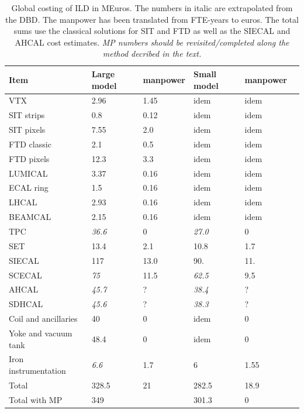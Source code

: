 \begin{table}[h!]\hspace*{-0cm}\small
\begin{tabular}{ l p{0.2\hsize}p{0.1\hsize}p{0.2\hsize} p{0.2\hsize}p{0.1\hsize}}
\toprule
\bf {Item}& \bf {Large model} & \bf manpower&  \bf {Small model}&\bf manpower \\
\midrule
VTX        & 2.96  &1.45  &  idem &idem \\
SIT strips & 0.8   &0.12 & idem&idem\\
SIT pixels & 7.55  &2.0 & idem&idem\\
FTD classic & 2.1   &0.5  & idem &idem  \\
FTD pixels  & 12.3  &3.3  & idem &idem  \\
LUMICAL & 3.37  & 0.16& idem&idem\\
ECAL ring & 1.5 & 0.16 & idem&idem\\
LHCAL   & 2.93  & 0.16&idem& idem\\
BEAMCAL & 2.15  & 0.16& idem&idem\\
\midrule
TPC & \it36.6 & 0 & \it27.0 & 0\\
SET    & 13.4& 2.1&10.8&1.7\\
SIECAL & 117 & 13.0 & 90. & 11.\\
SCECAL & \it75 & 11.5 & \it62.5 & 9.5\\
AHCAL  & \it45.7 & ? & \it38.4 & ?\\
SDHCAL & \it45.6 & ? & \it38.3 & ?\\
Coil and ancillaries &  40 & 0& idem & 0\\
Yoke and vacuum tank &  48.4 & 0& idem & 0 \\
Iron instrumentation  &  \it6.6 & 1.7 & 6 & 1.55\\
\midrule
Total      & 328.5   &  21  & 282.5 & 18.9  \\
\midrule
Total with MP     & 349   &    & 301.3 & 0  \\
 \bottomrule
\end{tabular}
\caption{\label{cost_summary}Global costing of ILD in MEuros. The numbers in italic are extrapolated from the DBD. The manpower has been translated from FTE-years to euros. The total sums use the classical solutions for SIT and FTD as well as the SIECAL and AHCAL cost estimates. 
\textit{MP numbers should be revisited/completed along the method decribed in the text.} }
\end{table}

